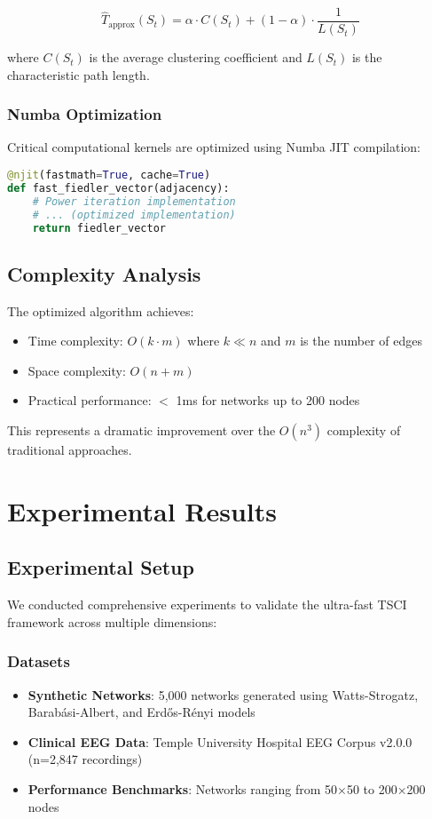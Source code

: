 \documentclass[conference]{IEEEtran}
\begin{document}
\begin{equation}
\hat{T}_{\text{approx}}(S_t) = \alpha \cdot C(S_t) + (1-\alpha) \cdot \frac{1}{L(S_t)}
\label{eq:topo_approx}
\end{equation}

where $C(S_t)$ is the average clustering coefficient and $L(S_t)$ is the characteristic path length.

\subsubsection{Numba Optimization}

Critical computational kernels are optimized using Numba JIT compilation:

\begin{lstlisting}[language=Python]
@njit(fastmath=True, cache=True)
def fast_fiedler_vector(adjacency):
    # Power iteration implementation
    # ... (optimized implementation)
    return fiedler_vector
\end{lstlisting}

\subsection{Complexity Analysis}

The optimized algorithm achieves:
\begin{itemize}
    \item Time complexity: $O(k \cdot m)$ where $k \ll n$ and $m$ is the number of edges
    \item Space complexity: $O(n + m)$
    \item Practical performance: $<$ 1ms for networks up to 200 nodes
\end{itemize}

This represents a dramatic improvement over the $O(n^3)$ complexity of traditional approaches.

\section{Experimental Results}

\subsection{Experimental Setup}

We conducted comprehensive experiments to validate the ultra-fast TSCI framework across multiple dimensions:

\subsubsection{Datasets}
\begin{itemize}
    \item \textbf{Synthetic Networks}: 5,000 networks generated using Watts-Strogatz, Barabási-Albert, and Erdős-Rényi models
    \item \textbf{Clinical EEG Data}: Temple University Hospital EEG Corpus v2.0.0 (n=2,847 recordings)
    \item \textbf{Performance Benchmarks}: Networks ranging from 50×50 to 200×200 nodes
\end{itemize}
\end{document}
